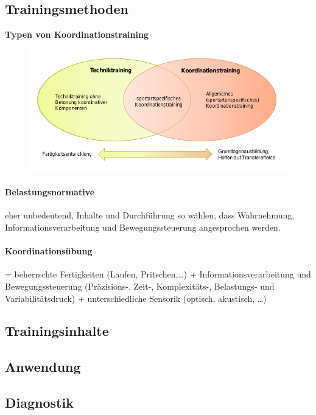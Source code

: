 \subsection{Trainingsmethoden}
\textbf{Typen von Koordinationstraining}
\begin{figure}[H]
  \centering
  \includegraphics[width=.7\textwidth]{pictures/koordinationstraining_typen.png}
\end{figure}
\paragraph{Belastungsnormative} eher unbedeutend, Inhalte und Durchführung so wählen, dass Wahrnehmung, Informationsverarbeitung und Bewegungssteuerung angesprochen werden.
\paragraph{Koordinationsübung} = beherrschte Fertigkeiten (Laufen, Pritschen,\ldots) + Informationsverarbeitung und Bewegungssteuerung (Präzisions-, Zeit-, Komplexitäts-, Belastungs- und Variabilitätsdruck) + unterschiedliche Sensorik (optisch, akustisch, \ldots)

\subsection{Trainingsinhalte}

\subsection{Anwendung}

\subsection{Diagnostik}
